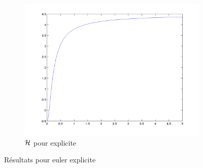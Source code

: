\begin{figure}
\begin{subfigure}[b]{0.45\textwidth}
    \includegraphics[width=\textwidth]{images/Q1_explicite_H.png}
    \caption{$\mathcal{H}$ pour explicite}
    \label{fig:q1_explicite_H}
  \end{subfigure}
  \caption{Résultats pour euler explicite}\label{fig:q1_explicite}
\end{figure}

